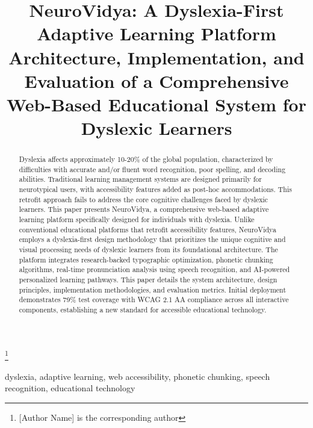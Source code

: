 \documentclass[journal]{IEEEtran}
\begin{document}
\title{NeuroVidya: A Dyslexia-First Adaptive Learning Platform\\
Architecture, Implementation, and Evaluation of a Comprehensive Web-Based Educational System for Dyslexic Learners}

\author{
}

\thanks{[Author Name] is the corresponding author}

\maketitle

\begin{abstract}
Dyslexia affects approximately 10-20\% of the global population, characterized by difficulties with accurate and/or fluent word recognition, poor spelling, and decoding abilities. Traditional learning management systems are designed primarily for neurotypical users, with accessibility features added as post-hoc accommodations. This retrofit approach fails to address the core cognitive challenges faced by dyslexic learners. This paper presents NeuroVidya, a comprehensive web-based adaptive learning platform specifically designed for individuals with dyslexia. Unlike conventional educational platforms that retrofit accessibility features, NeuroVidya employs a dyslexia-first design methodology that prioritizes the unique cognitive and visual processing needs of dyslexic learners from its foundational architecture. The platform integrates research-backed typographic optimization, phonetic chunking algorithms, real-time pronunciation analysis using speech recognition, and AI-powered personalized learning pathways. This paper details the system architecture, design principles, implementation methodologies, and evaluation metrics. Initial deployment demonstrates 79\% test coverage with WCAG 2.1 AA compliance across all interactive components, establishing a new standard for accessible educational technology.
\end{abstract}

\begin{IEEEkeywords}
dyslexia, adaptive learning, web accessibility, phonetic chunking, speech recognition, educational technology
\end{IEEEkeywords}
\end{document}
